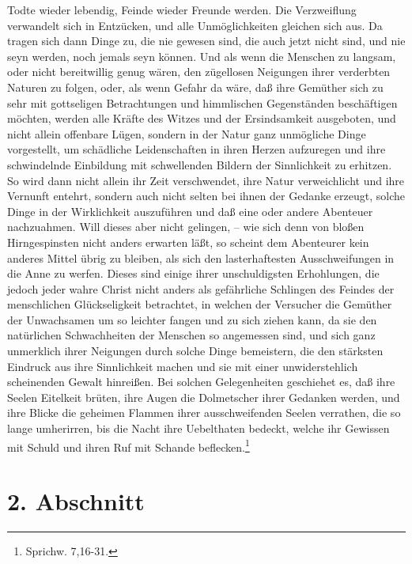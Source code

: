 Todte wieder lebendig, Feinde wieder Freunde werden. Die Verzweiflung verwandelt
sich in Entzücken, und alle Unmöglichkeiten gleichen sich aus. Da tragen sich
dann Dinge zu, die nie gewesen sind, die auch jetzt nicht sind, und nie seyn
werden, noch jemals seyn können. Und als wenn die Menschen zu langsam, oder
nicht bereitwillig genug wären, den zügellosen Neigungen ihrer verderbten
Naturen zu folgen, oder, als wenn Gefahr da wäre, daß ihre Gemüther sich zu sehr
mit gottseligen Betrachtungen und himmlischen Gegenständen beschäftigen möchten,
werden alle Kräfte des Witzes und der Ersindsamkeit ausgeboten, und nicht allein
offenbare Lügen, sondern in der Natur ganz unmögliche Dinge vorgestellt, um
schädliche Leidenschaften in ihren Herzen aufzuregen und ihre schwindelnde
Einbildung mit schwellenden Bildern der Sinnlichkeit zu erhitzen. So wird dann
nicht allein ihr Zeit verschwendet, ihre Natur verweichlicht und ihre Vernunft
entehrt, sondern auch nicht selten bei ihnen der Gedanke erzeugt, solche Dinge
in der Wirklichkeit auszuführen und daß eine oder andere Abenteuer nachzuahmen.
Will dieses aber nicht gelingen, -- wie sich denn von bloßen Hirngespinsten
nicht anders erwarten läßt, so scheint dem Abenteurer kein anderes Mittel übrig
zu bleiben, als sich den lasterhaftesten Ausschweifungen in die Anne zu werfen.
Dieses sind einige ihrer unschuldigsten Erhohlungen, die jedoch jeder wahre
Christ nicht anders als gefährliche Schlingen des Feindes der menschlichen
Glückseligkeit betrachtet, in welchen der Versucher die Gemüther der Unwachsamen
um so leichter fangen und zu sich ziehen kann, da sie den natürlichen
Schwachheiten der Menschen so angemessen sind, und sich ganz unmerklich ihrer
Neigungen durch solche Dinge bemeistern, die den stärksten Eindruck aus ihre
Sinnlichkeit machen und sie mit einer unwiderstehlich scheinenden Gewalt
hinreißen. Bei solchen Gelegenheiten geschiehet es, daß ihre Seelen Eitelkeit
brüten, ihre Augen die Dolmetscher ihrer Gedanken werden, und ihre Blicke die
geheimen Flammen ihrer ausschweifenden Seelen verrathen, die so lange
umherirren, bis die Nacht ihre Uebelthaten bedeckt, welche ihr Gewissen mit
Schuld und ihren Ruf mit Schande beflecken.\footnote{Sprichw. 7,16-31.}

\section{2. Abschnitt} \label{kap17_ab2}

